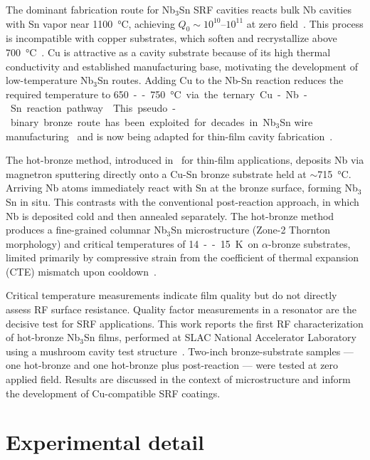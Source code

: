\documentclass{iopjournal}
\begin{document}
The dominant fabrication route for Nb$_3$Sn SRF cavities reacts bulk Nb cavities with Sn vapor near \qty{1100}{\degreeCelsius}, achieving $Q_0 \sim 10^{10}$--$10^{11}$ at zero field~\cite{Posen:2018zjb}. This process is incompatible with copper substrates, which soften and recrystallize above \qty{700}{\degreeCelsius}~\cite{okudaFabricationTestingLband1991}. Cu is attractive as a cavity substrate because of its high thermal conductivity and established manufacturing base, motivating the development of low-temperature Nb$_3$Sn routes. Adding Cu to the Nb-Sn reaction reduces the required temperature to \qty{650}--\qty{750}{\degreeCelsius} via the ternary Cu-Nb-Sn reaction pathway~\cite{suenagaChemicalCompositionsGrain1983}. This pseudo-binary bronze route has been exploited for decades in Nb$_3$Sn wire manufacturing~\cite{ambrosioNb3SnHighField2015} and is now being adapted for thin-film cavity fabrication~\cite{luDevelopmentPerformanceFirst2022, withanageRapidNbSn2021}.

The hot-bronze method, introduced in~\cite{withanageRapidNbSn2021} for thin-film applications, deposits Nb via magnetron sputtering directly onto a Cu-Sn bronze substrate held at $\sim$\qty{715}{\degreeCelsius}. Arriving Nb atoms immediately react with Sn at the bronze surface, forming Nb$_3$Sn in situ. This contrasts with the conventional post-reaction approach, in which Nb is deposited cold and then annealed separately. The hot-bronze method produces a fine-grained columnar Nb$_3$Sn microstructure (Zone-2 Thornton morphology) and critical temperatures of \qty{14}--\qty{15}{\kelvin} on $\alpha$-bronze substrates, limited primarily by compressive strain from the coefficient of thermal expansion (CTE) mismatch upon cooldown~\cite{ekinStrainScalingLaw1980, withanageRapidNbSn2021}.

Critical temperature measurements indicate film quality but do not directly assess RF surface resistance. Quality factor measurements in a resonator are the decisive test for SRF applications. This work reports the first RF characterization of hot-bronze Nb$_3$Sn films, performed at SLAC National Accelerator Laboratory using a mushroom cavity test structure~\cite{tantawiSuperconductingMaterialsTesting2007}. Two-inch bronze-substrate samples --- one hot-bronze and one hot-bronze plus post-reaction --- were tested at zero applied field. Results are discussed in the context of microstructure and inform the development of Cu-compatible SRF coatings.


\section{Experimental detail}
\end{document}
